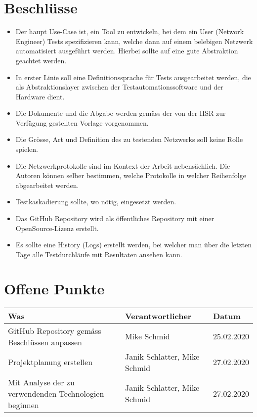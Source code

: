 \documentclass[
	ngerman,
	toc=listof, %
	toc=bibliography, %
	footnotes=multiple, %
	parskip=half, %
	numbers=noendperiod %
]{scrartcl}
\begin{document}
\section*{Beschlüsse}
\begin{itemize}
	\item Der haupt Use-Case ist, ein Tool zu entwickeln, bei dem ein User (Network Engineer) Tests spezifizieren kann, welche dann auf einem belebigen Netzwerk automatisiert ausgeführt werden. Hierbei sollte auf eine gute Abstraktion geachtet werden.
	\item In erster Linie soll eine Definitionssprache für Tests ausgearbeitet werden, die als Abstraktionslayer zwischen der Testautomationssoftware und der Hardware dient.
	\item Die Dokumente und die Abgabe werden gemäss der von der HSR zur Verfügung gestellten Vorlage vorgenommen.
	\item Die Grösse, Art und Definition des zu testenden Netzwerks soll keine Rolle spielen. 
	\item Die Netzwerkprotokolle sind im Kontext der Arbeit nebensächlich. Die Autoren können selber bestimmen, welche Protokolle in welcher Reihenfolge abgearbeitet werden.
	\item Testkaskadierung sollte, wo nötig, eingesetzt werden.
	\item Das GitHub Repository wird als öffentliches Repository mit einer OpenSource-Lizenz erstellt.
	\item Es sollte eine History (Logs) erstellt werden, bei welcher man über die letzten Tage alle Testdurchläufe mit Resultaten ansehen kann.
\end{itemize}

\section*{Offene Punkte}
\begin{tabularx}{0.9\linewidth}{Xll}
	\toprule
	Was & Verantwortlicher & Datum \\
	\midrule
	GitHub Repository gemäss Beschlüssen anpassen & Mike Schmid & 25.02.2020 \\
	Projektplanung erstellen & Janik Schlatter, Mike Schmid & 27.02.2020 \\
	Mit Analyse der zu verwendenden Technologien beginnen & Janik Schlatter, Mike Schmid & 27.02.2020 \\
	\bottomrule
\end{tabularx}
\end{document}
